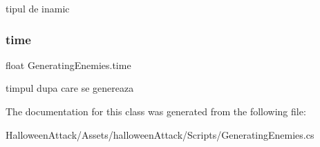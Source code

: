 tipul de inamic \mbox{\label{class_generating_enemies_a6e62912d45be356c13984ef19569879a}} 
\subsubsection{\texorpdfstring{time}{time}}
{\footnotesize\ttfamily float Generating\+Enemies.\+time}

timpul dupa care se genereaza 

The documentation for this class was generated from the following file\+:\begin{DoxyCompactItemize}
\item 
Halloween\+Attack/\+Assets/halloween\+Attack/\+Scripts/Generating\+Enemies.\+cs\end{DoxyCompactItemize}
